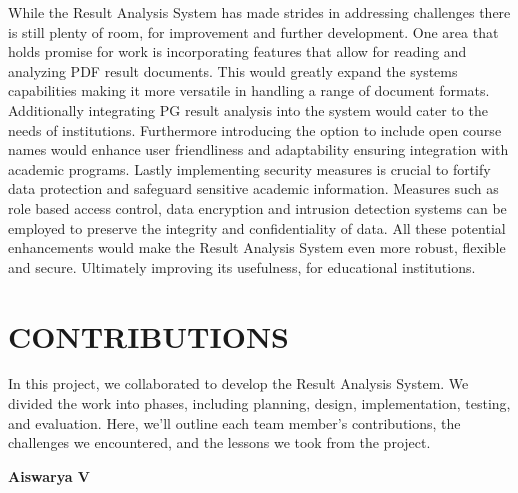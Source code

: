 \documentclass{nascproject}
\begin{document}
While the Result Analysis System has made strides in addressing challenges there is still plenty of room, for improvement and further development. One area that holds promise for work is incorporating features that allow for reading and analyzing PDF result documents. This would greatly expand the systems capabilities making it more versatile in handling a range of document formats. Additionally integrating PG result analysis into the system would cater to the needs of institutions. Furthermore introducing the option to include open course names would enhance user friendliness and adaptability ensuring integration with academic programs. Lastly implementing security measures is crucial to fortify data protection and safeguard sensitive academic information. Measures such as role based access control, data encryption and intrusion detection systems can be employed to preserve the integrity and confidentiality of data. All these potential enhancements would make the Result Analysis System even more robust, flexible and secure. Ultimately improving its usefulness, for educational institutions.



\chapter{CONTRIBUTIONS}
	In this project, we collaborated to develop the Result Analysis System. We divided the work into phases, including planning, design, implementation, testing, and evaluation. Here, we'll outline each team member's contributions, the challenges we encountered, and the lessons we took from the project.
	
	
	\textbf{Aiswarya V}
	
\end{document}
